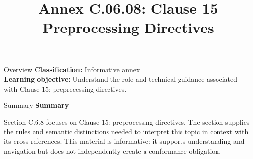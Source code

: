 \documentclass[10pt,letterpaper]{article}
\title{Annex C.06.08: Clause 15 Preprocessing Directives}
\author{}
\date{}
\begin{document}
\maketitle
\begin{CornellOverviewBox}{Overview}
\textbf{Classification:} Informative annex\\[2pt]
\textbf{Learning objective:} Understand the role and technical guidance associated with Clause 15: preprocessing directives.
\end{CornellOverviewBox}\begin{CornellSummaryBox}{Summary}
{\sffamily\bfseries\color{Accent} Summary}\par\vspace{3pt}Section C.6.8 focuses on Clause 15: preprocessing directives. The section supplies the rules and semantic distinctions needed to interpret this topic in context with its cross-references. This material is informative: it supports understanding and navigation but does not independently create a conformance obligation.
\end{CornellSummaryBox}
\end{document}
